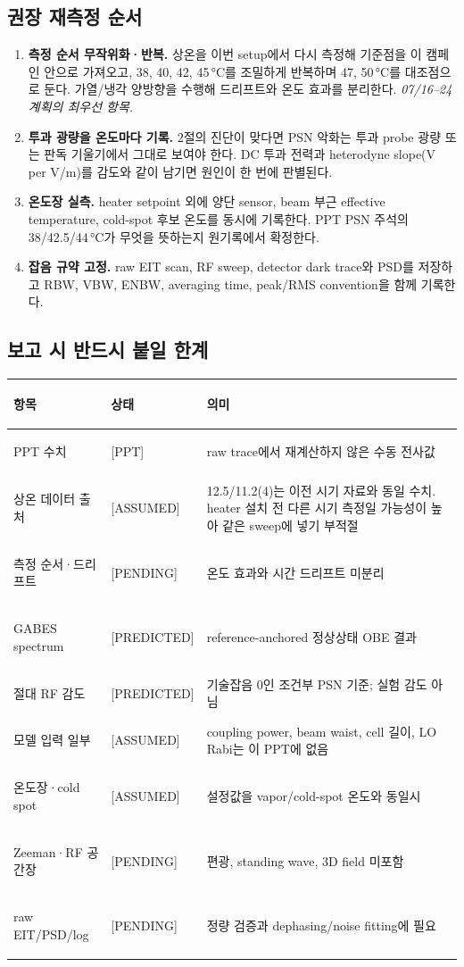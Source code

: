 \documentclass[10pt,a4paper]{article}
\newcommand{\Status}[1]{\textsf{\footnotesize[#1]}}
\begin{document}
\subsection*{권장 재측정 순서}

\begin{enumerate}
  \setlength{\itemsep}{0.22em}
  \item \textbf{측정 순서 무작위화·반복.} 상온을 이번 setup에서 다시 측정해 기준점을 이 캠페인 안으로
        가져오고, 38, 40, 42, 45\,°C를 조밀하게 반복하며 47, 50\,°C를 대조점으로 둔다. 가열/냉각
        양방향을 수행해 드리프트와 온도 효과를 분리한다. \emph{07/16--24 계획의 최우선 항목.}
  \item \textbf{투과 광량을 온도마다 기록.} 2절의 진단이 맞다면 PSN 악화는 투과 probe 광량 또는
        판독 기울기에서 그대로 보여야 한다. DC 투과 전력과 heterodyne slope(V per V/m)를 감도와
        같이 남기면 원인이 한 번에 판별된다.
  \item \textbf{온도장 실측.} heater setpoint 외에 양단 sensor, beam 부근 effective temperature,
        cold-spot 후보 온도를 동시에 기록한다. PPT PSN 주석의 38/42.5/44\,°C가 무엇을 뜻하는지
        원기록에서 확정한다.
  \item \textbf{잡음 규약 고정.} raw EIT scan, RF sweep, detector dark trace와 PSD를 저장하고
        RBW, VBW, ENBW, averaging time, peak/RMS convention을 함께 기록한다.
\end{enumerate}

\subsection*{보고 시 반드시 붙일 한계}

\begin{tabularx}{\textwidth}{>{\bfseries\raggedright\arraybackslash}p{3.35cm}p{2.05cm}X}
\toprule
항목 & 상태 & 의미\\
\midrule
PPT 수치 & \Status{PPT} & raw trace에서 재계산하지 않은 수동 전사값\\
상온 데이터 출처 & \Status{ASSUMED} & 12.5/11.2(4)는 이전 시기 자료와 동일 수치. heater 설치 전
다른 시기 측정일 가능성이 높아 같은 sweep에 넣기 부적절\\
측정 순서·드리프트 & \Status{PENDING} & 온도 효과와 시간 드리프트 미분리\\
GABES spectrum & \Status{PREDICTED} & reference-anchored 정상상태 OBE 결과\\
절대 RF 감도 & \Status{PREDICTED} & 기술잡음 0인 조건부 PSN 기준; 실험 감도 아님\\
모델 입력 일부 & \Status{ASSUMED} & coupling power, beam waist, cell 길이, LO Rabi는 이 PPT에 없음\\
온도장·cold spot & \Status{ASSUMED} & 설정값을 vapor/cold-spot 온도와 동일시\\
Zeeman·RF 공간장 & \Status{PENDING} & 편광, standing wave, 3D field 미포함\\
raw EIT/PSD/log & \Status{PENDING} & 정량 검증과 dephasing/noise fitting에 필요\\
\bottomrule
\end{tabularx}
\end{document}
